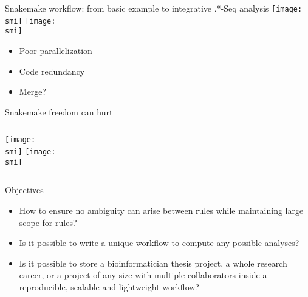 \documentclass[10pt]{beamer}
\def\smi{out/ln/updir/mw-gcthesis-oral/library.bib}
\begin{document}
    \begin{frame}{Snakemake workflow: from basic example to integrative .*-Seq analysis}
      \def\smi{out/ln/updir/mw-gcthesis-oral/ink/snakemake/rna-seq-star-deseq2.png}
      \texttt{[image: \\smi]}%
      \def\smi{out/ln/updir/mw-gcthesis-oral/ink/snakemake/snakechunk.png}
      \texttt{[image: \\smi]}
      {\small
      \begin{multicols}{3}
        \begin{itemize}
          \item Poor parallelization
          \item Code redundancy
          \item Merge?
        \end{itemize}
      \end{multicols}
      }
    \end{frame}
    \begin{frame}{Snakemake freedom can hurt}
      \begin{columns}
        \def\smi{out/ln/updir/mw-gcthesis-oral/ink/snakemake/ambiguous_rules.pdf}
        \texttt{[image: \\smi]}%
        \def\smi{out/ln/updir/mw-gcthesis-oral/ink/snakemake/venn_snakemake_output.pdf}
        \texttt{[image: \\smi]}%
      \end{columns}
    \end{frame}
    \begin{frame}{Objectives}
      \begin{itemize}
        \item How to ensure no ambiguity can arise between rules while maintaining large scope for rules?
        \item Is it possible to write a unique workflow to compute any possible analyses?
        \item Is it possible to store a bioinformatician thesis project, a whole research career, or a project of any size with multiple collaborators inside a reproducible, scalable and lightweight workflow?
      \end{itemize}
    \end{frame}
\end{document}

